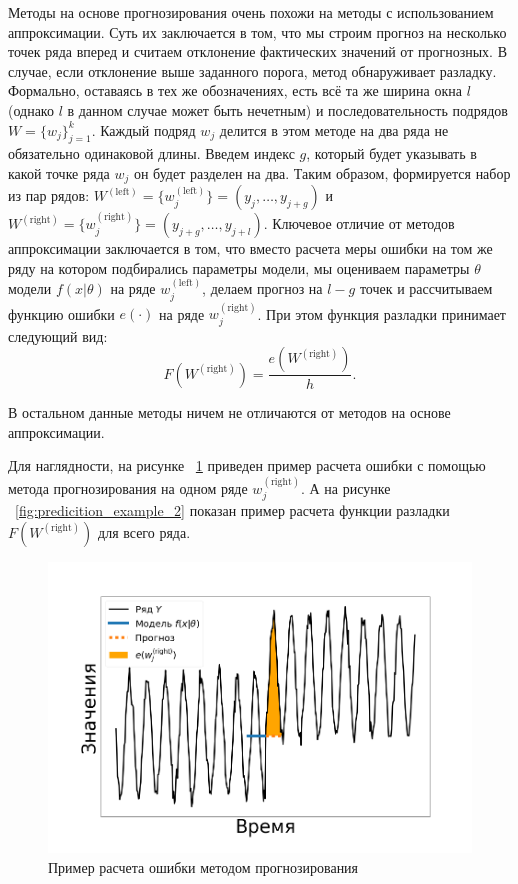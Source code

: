 \documentclass[%
12pt,
master,  %
natbib,      %
subf,        %
substylefile = spbu.rtx,
href,        %
colorlinks,  %
]{disser}
\begin{document}
Методы на основе прогнозирования очень похожи на методы с использованием аппроксимации. Суть их заключается в том, что мы строим прогноз на несколько точек ряда вперед и считаем отклонение фактических значений от прогнозных. В случае, если отклонение выше заданного порога, метод обнаруживает разладку.
Формально, оставаясь в тех же обозначениях, есть всё та же ширина окна $l$ (однако $l$ в данном случае может быть нечетным) и последовательность подрядов $W = \{ w_j \}_{j=1}^k$. Каждый подряд  $w_j$ делится в этом методе на два ряда не обязательно одинаковой длины. Введем индекс $g$, который будет указывать в какой точке ряда $w_j$ он будет разделен на два. Таким образом, формируется набор из пар рядов:  $ W^{\mathrm{(left)}} = \{w_j^{\mathrm{(left)}} \}  =  (y_j, \dots, y_{j+g})$ и $W^{\mathrm{(right)}} = \{w_j^{\mathrm{(right)}} \} = (y_{j+g}, \dots, y_{j+l})$. Ключевое отличие от методов аппроксимации заключается в том, что вместо расчета меры ошибки на том же ряду на котором подбирались параметры модели, мы оцениваем параметры $\theta$ модели $f(x|\theta)$ на ряде $ w_j^{\mathrm{(left)}} $, делаем прогноз на $ l - g $ точек и рассчитываем функцию ошибки $ e(\cdot) $ на ряде $ w_j^{\mathrm{(right)}} $. При этом функция разладки принимает следующий вид:
	\begin{equation*}
	 F(W^{\mathrm{(right)}}) = \frac{e(W^{\mathrm{(right)}})}{h}.
	 \end{equation*}

В остальном данные методы ничем не отличаются от методов на основе аппроксимации.

Для наглядности, на рисунке ~\ref{fig:predicition_example_1} приведен пример расчета ошибки с помощью метода прогнозирования на одном ряде  $ w_j^{\mathrm{(right)}} $. А на рисунке ~\ref{fig:predicition_example_2} показан пример расчета функции разладки $ F(W^{\mathrm{(right)}}) $ для всего ряда.

\begin{figure}[!hhh]
	\begin{center}
		\includegraphics[width=12cm]{approaches_first_4_ru}
	\end{center}
	\vspace{-5mm}\caption{Пример расчета ошибки методом прогнозирования}
	\label{fig:predicition_example_1}
\end{figure}
\end{document}

